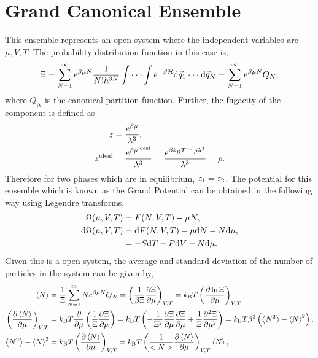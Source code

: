 \documentclass[a4paper]{article}
\begin{document}
\section{Grand Canonical Ensemble}
This ensemble represents an open system where the independent variables are $\mu, V,T$. The probability distribution function in this case is,
\begin{equation}
\Xi=\sum_{N=1}^{\infty}e^{\beta \mu N}\frac{1}{N!h^{3N}}\int\cdot\cdot\cdot\int e^{-\beta \mathcal{H}}{\rm d}\vec{q}_{1}\cdot\cdot\cdot{\rm d}\vec{q}_{N}=\sum_{N=1}^{\infty}e^{\beta \mu N}Q_{N},
\end{equation}
where $Q_{N}$ is the canonical partition function. Further, the fugacity of the component is defined as
\begin{equation}
\begin{split}
z&=\frac{e^{\beta\mu}}{\lambda^{3}},\\
z^{\rm ideal}&=\frac{e^{\beta\mu^{\rm ideal}}}{\lambda^{3}}=\frac{e^{\beta k_{\rm B}T\ln{\rho\lambda^{3}}}}{\lambda^{3}}=\rho.
\end{split}
\end{equation}
Therefore for two phases which are in equilibrium, $z_{\rm 1}=z_{\rm 2}$. The potential for this ensemble which is known as the Grand Potential can be obtained in the following way using Legendre transforms,
\begin{equation}
\begin{split}
\Omega(\mu,V,T)&=F(N,V,T)-\mu N,\\
{\rm d}\Omega(\mu,V,T)&={\rm d}F(N,V,T)-\mu{\rm d}N-N{\rm d}\mu,\\
&=-S{\rm d}T-P{\rm d}V-N{\rm d}\mu.
\end{split}
\end{equation}
Given this is a open system, the average  and standard deviation of the number of particles in the system can be given by,
\begin{equation}\label{eq:numberfluctuations}
\begin{split}
\left<N\right>&=\frac{1}{\Xi}\sum_{N=1}^{\infty}N e^{\beta \mu N}Q_{N}=\left(\frac{1}{\beta\Xi}\frac{\partial \Xi}{\partial \mu}\right)_{V,T}=k_{\rm B}T\left(\frac{\partial \ln{\Xi}}{\partial \mu}\right)_{V,T},\\
\left(\frac{\partial \left<N\right>}{\partial \mu}\right)_{V,T}&=k_{\rm B}T\frac{\partial}{\partial \mu}\left(\frac{1}{\Xi}\frac{\partial \Xi}{\partial \mu}\right)=k_{\rm B}T\left(-\frac{1}{\Xi^{2}}\frac{\partial \Xi}{\partial \mu}\frac{\partial \Xi}{\partial \mu}+\frac{1}{\Xi}\frac{\partial^{2} \Xi}{\partial \mu^{2}}\right)=k_{\rm B}T\beta^{2}\left(\left<N^{2}\right>-\left<N\right>^{2}\right),\\
\left<N^{2}\right>-\left<N\right>^{2}&=k_{\rm B}T\left(\frac{\partial \left<N\right>}{\partial \mu}\right)_{V,T}=k_{\rm B}T\left(\frac{1}{<N>}\frac{\partial \left<N\right>}{\partial \mu}\right)_{V,T}\left<N\right>,
\end{split}
\end{equation}
\end{document}
